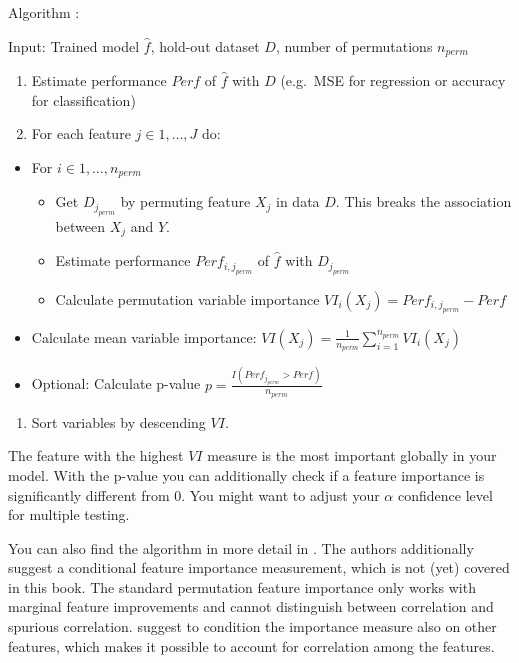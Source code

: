 \documentclass[12pt,]{krantz}
\providecommand{\tightlist}{%
  \setlength{\itemsep}{0pt}\setlength{\parskip}{0pt}}
\theoremstyle{definition}
\theoremstyle{definition}
\theoremstyle{definition}
\theoremstyle{remark}
\begin{document}
Algorithm \citep{breiman2001random}:

Input: Trained model \(\hat{f}\), hold-out dataset \(D\), number of
permutations \(n_{perm}\)

\begin{enumerate}
\def\labelenumi{\arabic{enumi}.}
\tightlist
\item
  Estimate performance \(Perf\) of \(\hat{f}\) with \(D\) (e.g.~MSE for
  regression or accuracy for classification)
\item
  For each feature \(j \in 1, \ldots, J\) do:
\end{enumerate}

\begin{itemize}
\tightlist
\item
  For \(i \in 1,\ldots , n_{perm}\)

  \begin{itemize}
  \tightlist
  \item
    Get \(D_{j_{perm}}\) by permuting feature \(X_j\) in data \(D\).
    This breaks the association between \(X_j\) and \(Y\).
  \item
    Estimate performance \(Perf_{i,j_{perm}}\) of \(\hat{f}\) with
    \(D_{j_{perm}}\)
  \item
    Calculate permutation variable importance
    \(VI_i(X_j) = Perf_{i,j_{perm}} - Perf\)
  \end{itemize}
\item
  Calculate mean variable importance:
  \(VI(X_j) = \frac{1}{n_{perm}}\sum_{i=1}^{n_{perm}} VI_i(X_j)\)
\item
  Optional: Calculate p-value
  \(p = \frac{I(Perf_{j_{perm}} > Perf)}{n_{perm}}\)
\end{itemize}

\begin{enumerate}
\def\labelenumi{\arabic{enumi}.}
\setcounter{enumi}{2}
\tightlist
\item
  Sort variables by descending \(VI\).
\end{enumerate}

The feature with the highest \(VI\) measure is the most important
globally in your model. With the p-value you can additionally check if a
feature importance is significantly different from 0. You might want to
adjust your \(\alpha\) confidence level for multiple testing.

You can also find the algorithm in more detail in \citep{Strobl2008}.
The authors additionally suggest a conditional feature importance
measurement, which is not (yet) covered in this book. The standard
permutation feature importance only works with marginal feature
improvements and cannot distinguish between correlation and spurious
correlation. \citep{Strobl2008} suggest to condition the importance
measure also on other features, which makes it possible to account for
correlation among the features.
\end{document}
